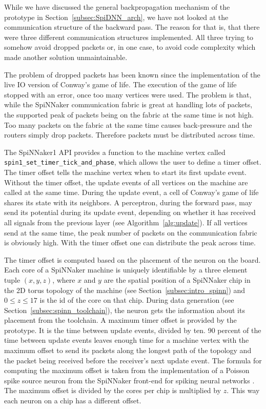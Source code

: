 \documentclass[]{article}
\begin{document}
While we have discussed the general backpropagation mechanism of the
prototype in Section~\ref{subsec:SpiDNN_arch}, we have not looked at
the communication structure of the backward pass.
The reason for that is, that there were three different
communication structures implemented.
All three trying to somehow avoid dropped packets or, in one case,
to avoid code complexity which made another solution unmaintainable.

The problem of dropped packets has been known since the implementation
of the live IO version of Conway's game of life.
The execution of the game of life stopped with an error, once too many
vertices were used.
The problem is that, while the SpiNNaker communication fabric is great
at handling lots of packets, the supported peak of packets being on
the fabric at the same time is not high.
Too many packets on the fabric at the same time causes back-pressure
and the routers simply drop packets.
Therefore packets must be distributed across time.

The SpiNNaker1 API provides a function to the machine vertex called
\texttt{spin1\_set\_timer\_tick\_\-and\_phase}, which allows the user to
define a timer offset.
The timer offset tells the machine vertex when to start its first
update event.
Without the timer offset, the update events of all vertices on the
machine are called at the same time.
During the update event, a cell of Conway's game of life shares its
state with its neighbors.
A perceptron, during the forward pass, may send its potential during
its update event, depending on whether it has received all signals
from the previous layer (see Algorithm~\ref{alg:update}).
If all vertices send at the same time, the peak number of packets on
the communication fabric is obviously high.
With the timer offset one can distribute the peak across time.

The timer offset is computed based on the placement of the neuron on
the board.
Each core of a SpiNNaker machine is uniquely identifiable by a three
element tuple $(x, y, z)$, where $x$ and $y$ are the spatial position
of a SpiNNaker chip in the 2D torus topology of the machine (see
Section~\ref{subsec:intro_spinn}) and $0 \leq z \leq 17$ is the id of
the core on that chip.
During data generation (see Section~\ref{subsec:spinn_toolchain}),
the neuron gets the information about its placement from the
toolchain.
A maximum timer offset is provided by the prototype.
It is the time between update events, divided by ten.
90 percent of the time between update events leaves enough time
for a machine vertex with the maximum offset to send its packets along
the longest path of the topology and the packet being received before
the receiver's next update event.
The formula for computing the maximum offset is taken from
the implementation of a Poisson spike source neuron from the
SpiNNaker front-end for spiking neural networks
\citep{spinnaker_2020c}.
The maximum offset is divided by the cores per chip is multiplied by
$z$.
This way each neuron on a chip has a different offset.
\end{document}
